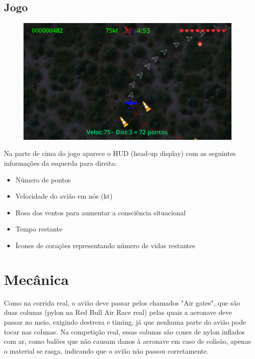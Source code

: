 \section{Jogo}

\begin{figure}[h]
    \centering
    \includegraphics[width=\textwidth]{game.png}
\end{figure}

Na parte de cima do jogo aparece o HUD (head-up display) com as seguintes informações da
esquerda para direita:

\begin{itemize}
\item {Número de pontos}
\item {Velocidade do avião em nós (kt)}
\item {Rosa dos ventos para aumentar a consciência situacional}
\item {Tempo restante}
\item {Ícones de corações representando número de vidas restantes}
\end{itemize}

\chapter{Mecânica}

Como na corrida real, o avião deve passar pelos chamados "Air gates", que são duas colunas (pylon na Red Bull Air Race real) pelas quais a aeronave deve passar no meio, exigindo destreza e timing, já que nenhuma parte do avião pode tocar nas colunas. Na competição real, essas colunas são cones de nylon inflados com ar, como balões que não causam danos à aeronave em caso de colisão, apenas o material se rasga, indicando que o avião não passou corretamente.

